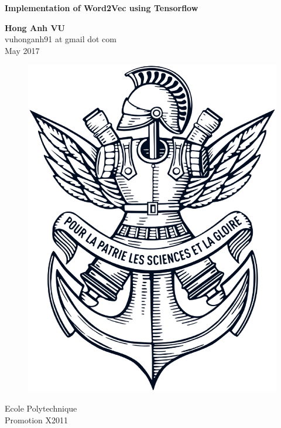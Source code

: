 \documentclass[12pt,oneside,a4paper]{book}
\theoremstyle{break}
\begin{document}
\boldmath
\begin{titlepage}
    \begin{center}
        
        \Huge
        \textbf{}
        
        \vspace{0.5cm}
        \LARGE
        \textbf{Implementation of Word2Vec using Tensorflow}
        
        \vspace{1.5cm}
        
        \textbf{Hong Anh VU}\\
        vuhonganh91 at gmail dot com\\
        May 2017
        
        \vfill        

        \begin{figure}[!ht]
          \centering
          \includegraphics[scale=0.28]{xLogo.eps}
        \end{figure}
        
        \Large
        Ecole Polytechnique\\
        Promotion X2011\\
        
    \end{center}
\end{titlepage}
\end{document}
